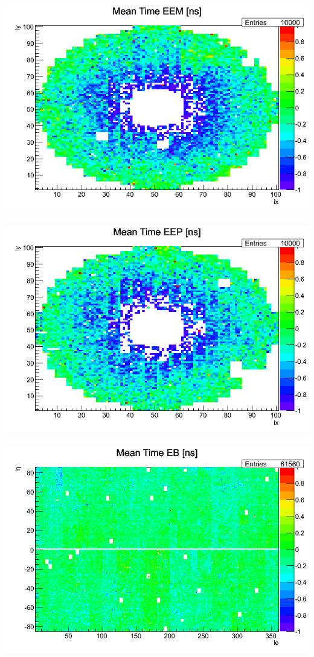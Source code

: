 \documentclass{beamer}
\begin{document}
\begin{frame}
\begin{minipage}[b]{0.85\paperwidth}
\begin{tcolorbox}[colback=UNL@Cream!5,colframe=UNL@Cream!70,title=\textcolor{UMN@Maroon}{\textbf{Calibration Procedure}}]
\begin{columns}
\begin{column}{0.65\linewidth}
     \end{column}
    \end{columns}      
  \end{tcolorbox}
\end{minipage}
\begin{minipage}[b]{0.83\paperwidth}
 \begin{columns}
   \begin{column}{0.50\linewidth}
     \begin{tcolorbox}[colback=UNL@Cream!5,colframe=UNL@Cream!70,title=\textcolor{UMN@Maroon}{\textbf{Before Calibration}}] 
       \mbox{
            \includegraphics[height=0.45\textwidth, width=0.53\linewidth]{THESISPLOTS/calibDiffMapEEM_Before_CALIB.png} 
            \includegraphics[height=0.45\textwidth, width=0.53\linewidth]{THESISPLOTS/calibDiffMapEEP_Before_CALIB.png} }
            \includegraphics[height=0.45\textwidth, width=0.93\linewidth]{THESISPLOTS/calibDiffMapEB_Before_Calibration.png}

\end{tcolorbox}
\end{column}
\end{columns}
\end{minipage}
\end{frame}
\end{document}
